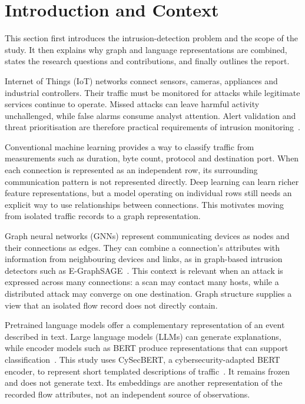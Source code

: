 \section{Introduction and Context}
\label{sec:introduction}

This section first introduces the intrusion-detection problem and the scope of the study. It then explains why graph and language representations are combined, states the research questions and contributions, and finally outlines the report.

Internet of Things (IoT) networks connect sensors, cameras, appliances and industrial controllers. Their traffic must be monitored for attacks while legitimate services continue to operate. Missed attacks can leave harmful activity unchallenged, while false alarms consume analyst attention. Alert validation and threat prioritisation are therefore practical requirements of intrusion monitoring~\citep{scarfone2007idps}.

Conventional machine learning provides a way to classify traffic from measurements such as duration, byte count, protocol and destination port. When each connection is represented as an independent row, its surrounding communication pattern is not represented directly. Deep learning can learn richer feature representations, but a model operating on individual rows still needs an explicit way to use relationships between connections. This motivates moving from isolated traffic records to a graph representation.

Graph neural networks (GNNs) represent communicating devices as nodes and their connections as edges. They can combine a connection's attributes with information from neighbouring devices and links, as in graph-based intrusion detectors such as E-GraphSAGE~\citep{lo2022egraphsage}. This context is relevant when an attack is expressed across many connections: a scan may contact many hosts, while a distributed attack may converge on one destination. Graph structure supplies a view that an isolated flow record does not directly contain.

Pretrained language models offer a complementary representation of an event described in text. Large language models (LLMs) can generate explanations, while encoder models such as BERT produce representations that can support classification~\citep{devlin2019bert}. This study uses CySecBERT, a cybersecurity-adapted BERT encoder, to represent short templated descriptions of traffic~\citep{bayer2024cysecbert}. It remains frozen and does not generate text. Its embeddings are another representation of the recorded flow attributes, not an independent source of observations.

